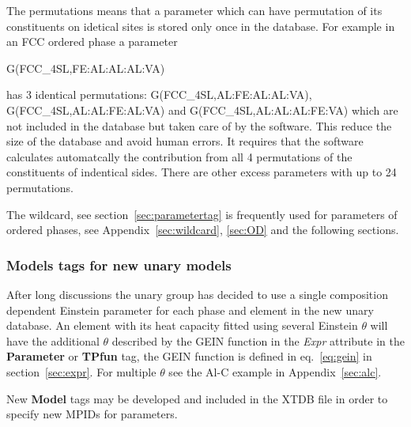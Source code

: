 \documentclass{article}
\begin{document}
The permutations means that a parameter which can have permutation of
its constituents on idetical sites is stored only once in the
database.  For example in an FCC ordered phase a parameter

G(FCC\_4SL,FE:AL:AL:AL:VA)

\noindent
has 3 identical permutations: G(FCC\_4SL,AL:FE:AL:AL:VA),
G(FCC\_4SL,AL:AL:FE:AL:VA) and G(FCC\_4SL,AL:AL:AL:FE:VA) which are
not included in the database but taken care of by the software.  This
reduce the size of the database and avoid human errors.  It requires
that the software calculates automatcally the contribution from all 4
permutations of the constituents of indentical sides.  There are other
excess parameters with up to 24 permutations.

The wildcard, see section~\ref{sec:parametertag} is frequently used
for parameters of ordered phases, see Appendix~\ref{sec:wildcard},
\ref{sec:OD} and the following sections.

\subsubsection{Models tags for new unary models}

After long discussions the unary group has decided to use a single
composition dependent Einstein parameter for each phase and element in
the new unary database.  An element with its heat capacity fitted
using several Einstein $\theta$ will have the additional $\theta$
described by the GEIN function in the {\em Expr} attribute in the {\bf
  Parameter} or {\bf TPfun} tag, the GEIN function is defined in
eq.~\ref{eq:gein} in section~\ref{sec:expr}.  For multiple $\theta$
see the Al-C example in Appendix~\ref{sec:alc}.

New {\bf Model} tags may be developed and included in the XTDB file in
order to specify new MPIDs for parameters.
\end{document}

